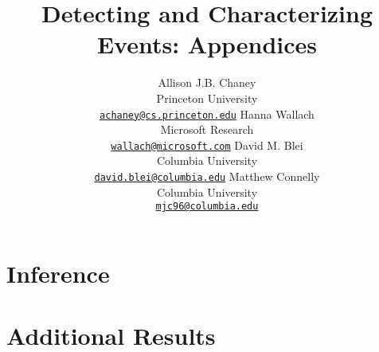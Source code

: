 \documentclass[11pt,letterpaper]{article}
\title{Detecting and Characterizing Events: Appendices}
\author{
Allison J.B. Chaney\\
    Princeton University\\
	\href{mailto:achaney@cs.princeton.edu}{\nolinkurl{achaney@cs.princeton.edu}}
\And
Hanna Wallach\\
    Microsoft Research\\
    \href{mailto:wallach@microsoft.com}{\nolinkurl{wallach@microsoft.com}}
\AND
David M. Blei\\
    Columbia University\\
    \href{mailto:david.blei@columbia.edu}{\nolinkurl{david.blei@columbia.edu}}
\And
Matthew Connelly\\
    Columbia University\\
    \href{mailto:mjc96@columbia.edu}{\nolinkurl{mjc96@columbia.edu}}
}
\date{}
\begin{document}
\begin{multicols}{2}
\maketitle
\end{multicols}

\appendix
\section{Inference}
\label{sec:inference}


\section{Additional Results}
\label{sec:additional_results}








\end{document}
